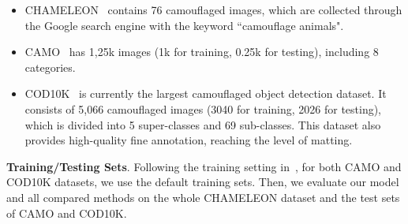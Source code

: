 \documentclass{article}
\begin{document}
\begin{itemize}
    \item CHAMELEON~\cite{fan2021concealed} contains 76 camouflaged images, which are collected through the Google search engine with the keyword ``camouflage animals".
    
    \item CAMO~\cite{anet} has 1,25k images (1k for training, 0.25k for testing), including 8 categories.
    
    \item COD10K~\cite{fan2021concealed} is currently the largest camouflaged object detection dataset. It consists of 5,066 camouflaged images (3040 for training, 2026 for testing), which is divided into 5 super-classes and 69 sub-classes. This dataset also provides high-quality fine annotation, reaching the level of matting.
\end{itemize}


\textbf{Training/Testing Sets}.
Following the training setting in~\cite{fan2021concealed}, for both CAMO and COD10K datasets, we use the default training sets.
Then, we evaluate our model and all compared methods on the whole CHAMELEON dataset and the test sets of CAMO and COD10K.
\end{document}
